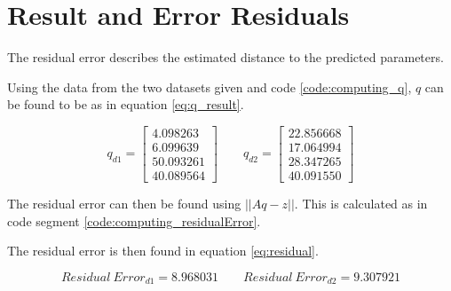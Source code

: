 \section{Result and Error Residuals}
The residual error describes the estimated distance to the predicted parameters.



Using the data from the two datasets given and code \ref{code:computing_q}, $q$ can be found to be as in equation \ref{eq:q_result}.



        
        
 

\begin{equation}
q_{d1} = 
\left[
\begin{array}{c}
4.098263 \\
6.099639 \\
50.093261 \\
40.089564
\end{array}
\right]
% 
\qquad
% 
q_{d2} = 
\left[
\begin{array}{c}
22.856668 \\
17.064994 \\
28.347265 \\
40.091550
\end{array}
\right]
\label{eq:q_result}
\end{equation}

The residual error can then be found using $|| Aq - z ||$.
This is calculated as in code segment \ref{code:computing_residualError}.



The residual error is then found in equation \ref{eq:residual}.

\begin{equation}
Residual\ Error_{d1} = 8.968031 
% 
\qquad
% 
Residual\ Error_{d2} = 9.307921
\label{eq:residual}
\end{equation}

